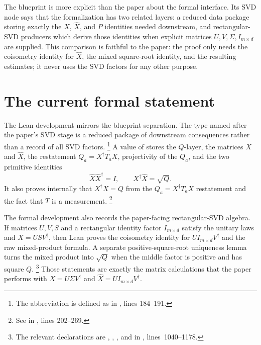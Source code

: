 \documentclass[11pt]{article}
\begin{document}
The blueprint is more explicit than the paper about the formal interface.  Its
SVD node says that the formalization has two related layers: a reduced data
package storing exactly the $X$, $\widehat X$, and $P$ identities needed
downstream, and rectangular-SVD producers which derive those identities when
explicit matrices $U,V,\Sigma,I_{m\times d}$ are supplied.  This comparison is
faithful to the paper: the proof only needs the coisometry identity for
$\widehat X$, the mixed square-root identity, and the resulting estimates; it
never uses the SVD factors for any other purpose.

\section{The current formal statement}

The Lean development mirrors the blueprint separation.  The type named after the
paper's SVD stage is a reduced package of downstream consequences rather than a
record of all SVD factors.%
\footnote{The abbreviation  is defined as
 in
, lines
184--191.}
A value of  stores the $Q$-layer, the matrices $X$ and
$\widehat X$, the restatement $Q_a=X^\dagger T_aX$, projectivity of the $Q_a$,
and the two primitive identities
\[
  \widehat X\widehat X^\dagger=I,
  \qquad
  X^\dagger\widehat X=\sqrt Q.
\]
It also proves internally that $X^\dagger X=Q$ from the $Q_a=X^\dagger T_aX$
restatement and the fact that $T$ is a measurement.%
\footnote{See  in
, lines
202--269.}

The formal development also records the paper-facing rectangular-SVD algebra.
If matrices $U,V,S$ and a rectangular identity factor $I_{m\times d}$ satisfy
the unitary laws and $X=USV^\dagger$, then Lean proves the coisometry identity
for $UI_{m\times d}V^\dagger$ and the raw mixed-product formula.  A separate
positive-square-root uniqueness lemma turns the mixed product into
$\sqrt Q$ when the middle factor is positive and has square $Q$.%
\footnote{The relevant declarations are
,
,
, and
 in
,
lines~1040--1178.}
Those statements are exactly the matrix calculations that the paper performs
with $X=U\Sigma V^\dagger$ and
$\widehat X=UI_{m\times d}V^\dagger$.
\end{document}

